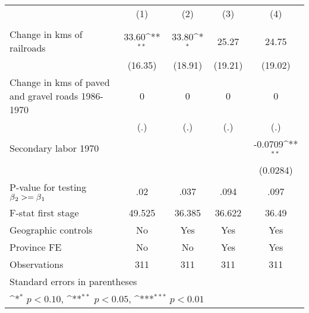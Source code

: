 {
\def\sym#1{\ifmmode^{#1}\else\(^{#1}\)\fi}
\begin{tabular}{l*{4}{c}}
\hline\hline
                &\multicolumn{1}{c}{(1)}&\multicolumn{1}{c}{(2)}&\multicolumn{1}{c}{(3)}&\multicolumn{1}{c}{(4)}\\
                &\multicolumn{1}{c}{}&\multicolumn{1}{c}{}&\multicolumn{1}{c}{}&\multicolumn{1}{c}{}\\
\hline
Change in kms of railroads&    33.60\sym{**} &    33.80\sym{*}  &    25.27         &    24.75         \\
                &  (16.35)         &  (18.91)         &  (19.21)         &  (19.02)         \\
[1em]
Change in kms of paved and gravel roads 1986-1970&        0         &        0         &        0         &        0         \\
                &      (.)         &      (.)         &      (.)         &      (.)         \\
[1em]
Secondary labor 1970&                  &                  &                  &  -0.0709\sym{**} \\
                &                  &                  &                  & (0.0284)         \\
\hline
P-value for testing $\beta\\_2 >= \beta\\_1$&      .02         &     .037         &     .094         &     .097         \\
F-stat first stage&   49.525         &   36.385         &   36.622         &    36.49         \\
Geographic controls&       No         &      Yes         &      Yes         &      Yes         \\
Province FE     &       No         &       No         &      Yes         &      Yes         \\
Observations    &      311         &      311         &      311         &      311         \\
\hline\hline
\multicolumn{5}{l}{\footnotesize Standard errors in parentheses}\\
\multicolumn{5}{l}{\footnotesize \sym{*} \(p<0.10\), \sym{**} \(p<0.05\), \sym{***} \(p<0.01\)}\\
\end{tabular}
}
